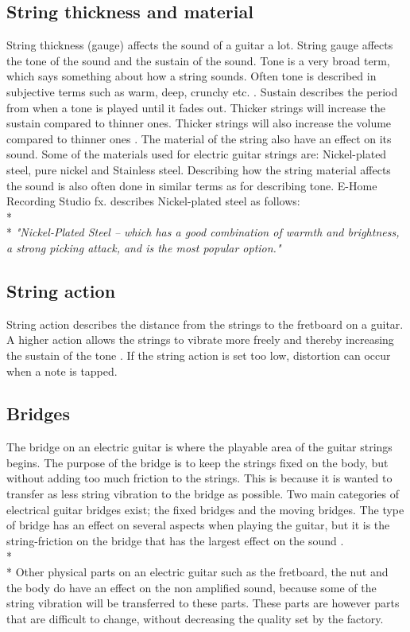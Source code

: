 \subsection{String thickness and material}
String thickness (gauge) affects the sound of a guitar a lot. String gauge affects the tone of the sound and the sustain of the sound. Tone is a very broad term, which says something about how a string sounds. Often tone is described in subjective terms such as warm, deep, crunchy etc. \cite{premierguitar}. Sustain describes the period from when a tone is played until it fades out. Thicker strings will increase the sustain compared to thinner ones. Thicker strings will also increase the volume compared to thinner ones \cite{Helsinki}.
The material of the string also have an effect on its sound. Some of the materials used for electric guitar strings are: Nickel-plated steel, pure nickel and Stainless steel. Describing how the string material affects the sound is also often done in similar terms as for describing tone. E-Home Recording Studio fx. describes Nickel-plated steel as follows:
\\*
\\*
\textit{"Nickel-Plated Steel – which has a good combination of warmth and brightness, a strong picking attack, and is the most popular option."}\cite{E-Home}

\subsection{String action}
String action describes the distance from the strings to the fretboard on a guitar. A higher action allows the strings to vibrate more freely and thereby increasing the sustain of the tone \cite{sweetwater}. If the string action is set too low, distortion can occur when a note is tapped.  

\subsection{Bridges}
The bridge on an electric guitar is where the playable area of the guitar strings begins. The purpose of the bridge is to keep the strings fixed on the body, but without adding too much friction to the strings. This is because it is wanted to transfer as less string vibration to the bridge as possible. Two main categories of electrical guitar bridges exist; the fixed bridges and the moving bridges. The type of bridge has an effect on several aspects when playing the guitar, but it is the string-friction on the bridge that has the largest effect on the sound \cite{seymourduncan}.
\\*
\\*
Other physical parts on an electric guitar such as the fretboard, the nut and the body do have an effect on the non amplified sound, because some of the string vibration will be transferred to these parts. These parts are however parts that are difficult to change, without decreasing the quality set by the factory.   




